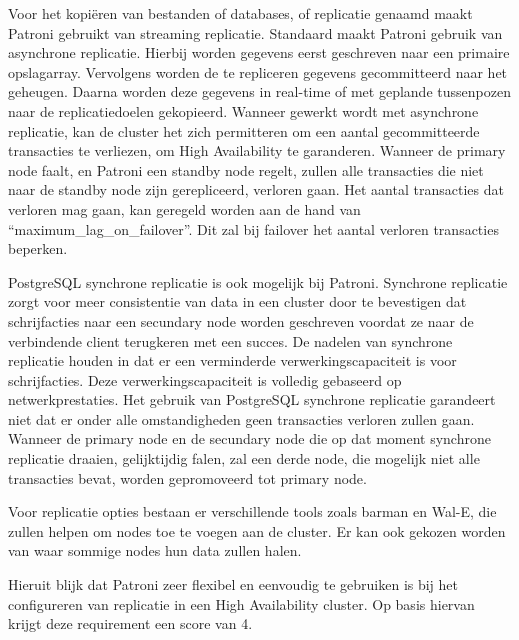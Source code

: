 Voor het kopiëren van bestanden of databases, of replicatie genaamd maakt Patroni gebruikt van streaming replicatie. Standaard maakt Patroni gebruik van asynchrone replicatie. Hierbij worden gegevens eerst geschreven naar een primaire opslagarray. Vervolgens worden de te repliceren gegevens gecommitteerd naar het geheugen. Daarna worden deze gegevens in real-time of met geplande tussenpozen naar de replicatiedoelen gekopieerd.
Wanneer gewerkt wordt met asynchrone replicatie, kan de cluster het zich permitteren om een aantal gecommitteerde transacties te verliezen, om High Availability te garanderen. Wanneer de primary node faalt, en Patroni een standby node regelt, zullen alle transacties die niet naar de standby node zijn gerepliceerd, verloren gaan. Het aantal transacties dat verloren mag gaan, kan geregeld worden aan de hand van “maximum\_lag\_on\_failover”. Dit zal bij failover het aantal verloren transacties beperken.

PostgreSQL synchrone replicatie is ook mogelijk bij Patroni. Synchrone replicatie zorgt voor meer consistentie van data in een cluster door te bevestigen dat schrijfacties naar een secundary node worden geschreven voordat ze naar de verbindende client terugkeren met een succes. De nadelen van synchrone replicatie houden in dat er een verminderde verwerkingscapaciteit is voor schrijfacties. Deze verwerkingscapaciteit is volledig gebaseerd op netwerkprestaties. Het gebruik van PostgreSQL synchrone replicatie garandeert niet dat er onder alle omstandigheden geen transacties verloren zullen gaan. Wanneer de primary node en de secundary node die op dat moment synchrone replicatie draaien, gelijktijdig falen, zal een derde node, die mogelijk niet alle transacties bevat, worden gepromoveerd tot primary node.

Voor replicatie opties bestaan er verschillende tools zoals barman en Wal-E, die zullen helpen om nodes toe te voegen aan de cluster. Er kan ook gekozen worden van waar sommige nodes hun data zullen halen.

Hieruit blijk dat Patroni zeer flexibel en eenvoudig te gebruiken is bij het configureren van replicatie in een High Availability cluster. Op basis hiervan krijgt deze requirement een score van 4.

\subsubsection{}
\label{subsubsec:Failover}


